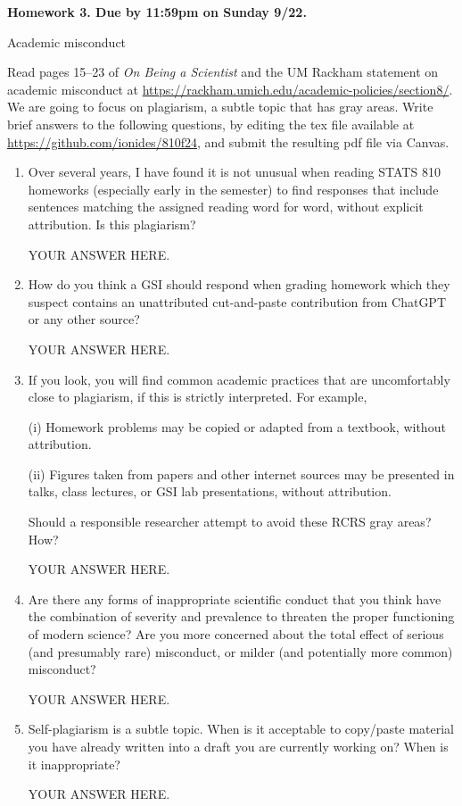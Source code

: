 \documentclass[12pt]{article}
\begin{document}
\begin{center}\bf
Homework 3. Due by 11:59pm on Sunday 9/22.

Academic misconduct

\end{center}
Read pages 15--23 of {\em On Being a Scientist} and the UM Rackham statement on academic misconduct at \url{https://rackham.umich.edu/academic-policies/section8/}. We are going to focus on plagiarism, a subtle topic that has gray areas. Write brief answers to the following questions, by editing the tex file available at \url{https://github.com/ionides/810f24}, and submit the resulting pdf file via Canvas. 

\begin{enumerate}

\item Over several years, I have found it is not unusual when reading STATS 810 homeworks (especially early in the semester) to find responses that include sentences matching the assigned reading word for word, without explicit attribution. Is this plagiarism?

YOUR ANSWER HERE.

\item How do you think a GSI should respond when grading homework which they suspect contains an unattributed cut-and-paste contribution from ChatGPT or any other source?

YOUR ANSWER HERE.

\item If you look, you will find common academic practices that are uncomfortably close to plagiarism, if this is strictly interpreted. For example,

(i) Homework problems may be copied or adapted from a textbook, without attribution.

(ii) Figures taken from papers and other internet sources may be presented in talks, class lectures, or GSI lab presentations, without attribution.

Should a responsible researcher attempt to avoid these RCRS gray areas? How?
  

YOUR ANSWER HERE.

\item Are there any forms of inappropriate scientific conduct that you think have the combination of severity and prevalence to threaten the proper functioning of modern science? Are you more concerned about the total effect of serious (and presumably rare) misconduct, or milder (and potentially more common) misconduct?

YOUR ANSWER HERE.

\item Self-plagiarism is a subtle topic. When is it acceptable to copy/paste material you have already written into a draft you are currently working on? When is it inappropriate?

YOUR ANSWER HERE.

\end{enumerate}
\end{document}
